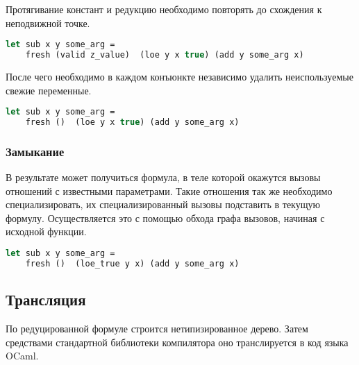 Протягивание констант и редукцию необходимо повторять до схождения к неподвижной точке.

\newpage

\begin{lstlisting}[caption=Отношение с лишними свежими именами, language=OCaml, frame=single, label = sub]
 let sub x y some_arg =
    fresh (valid z_value)  (loe y x true) (add y some_arg x)
\end{lstlisting}

После чего необходимо в каждом конъюнкте независимо удалить неиспользуемые свежие переменные.

\begin{lstlisting}[caption=Результирующее отношение, language=OCaml, frame=single, label = sub]
 let sub x y some_arg =
    fresh ()  (loe y x true) (add y some_arg x)
\end{lstlisting}

\subsubsection{Замыкание}

В результате может получиться формула, в теле которой окажутся вызовы отношений с известными параметрами. Такие отношения так же необходимо специализировать, их специализированный вызовы подставить в текущую формулу. Осуществляется это с помощью обхода графа вызовов, начиная с исходной функции.

\begin{lstlisting}[caption=Отношение со специализированным вызовом, language=OCaml, frame=single, label = sub]
 let sub x y some_arg =
    fresh ()  (loe_true y x) (add y some_arg x)
\end{lstlisting}

\subsection{Трансляция}

По редуцированной формуле строится нетипизированное дерево. Затем средствами стандартной библиотеки компилятора оно транслируется в код языка OCaml.
